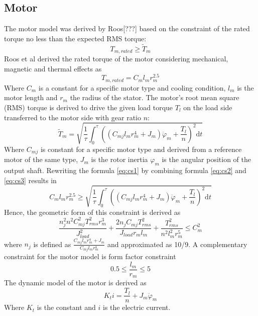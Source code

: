 \subsection*{Motor}
The motor model was derived by Roos[???] based on the constraint of the rated torque no less than the expected RMS torque:
\begin{equation} \label{eq:cs1}
T_{m,rated} \geqslant \tilde{T}_m
\end{equation}
Roos et al derived the rated torque of the motor considering mechanical, magnetic and thermal effects as
\begin{equation} \label{eq:cs2}
T_{m,rated}=C_ml_m r_m^{2.5}
\end{equation}
Where $C_m$ is a constant for a specific motor type and cooling condition, $l_m$ is the motor length and $r_m$ the radius of the stator. The motor’s root mean square (RMS) torque is derived to drive the given load torque $T_l$ on the load side transferred to the motor side with gear ratio $n$:
\begin{equation} \label{eq:cs3}
\tilde{T}_m=\sqrt{\frac{1}{\tau}\int_0^\tau ((C_{mj}l_m r_m^{4}+J_m)\ddot{\varphi}_m+\frac{T_l}{n})^2  \mathrm{d} t}
\end{equation}
Where $C_{mj}$ is constant for a specific motor type and derived from a reference motor of the same type, $J_m$ is the rotor inertia ${\varphi}_m$ is the angular position of the output shaft.
Rewriting the formula \ref{eq:cs1} by combining formula \ref{eq:cs2} and \ref{eq:cs3} results in
\begin{equation} \label{eq:cs4}
C_ml_m r_m^{2.5}\geqslant\sqrt{\frac{1}{\tau}\int_0^\tau ((C_{mj}l_m r_m^{4}+J_m)\ddot{\varphi}_m+\frac{T_l}{n})^2  \mathrm{d} t}
\end{equation}
Hence, the geometric form of this constraint is derived as
\begin{equation} \label{eq:cs5}
\frac{n_j^2 n^2 C_{mj}^2 T_{rms}^2 r_m^3}{J_{load}^2} + \frac{2 n_j C_{mj} T_{rms}^2}{J_{load} r_m l_m} + \frac{T_{rms}^2}{n^2 l_m^2 r_m^5} \leqslant C_m^2
\end{equation}
where $n_j$ is defined as $\frac{C_{mj}l_m r_m^{4}+J_m}{C_{mj}l_m r_m^{4}}$ and approximated as 10/9. 
A complementary constraint for the motor model is form factor constraint
\begin{equation} \label{eq:cs6}
0.5 \leqslant \frac{l_m}{r_m} \leqslant 5
\end{equation}
The dynamic model of the motor is derived as
\begin{equation} \label{eq:cs7}
K_ti= \frac{T_l}{n} + J_m\ddot{{\varphi}}_m
\end{equation}
Where $K_t$ is the constant and $i$ is the electric current.


